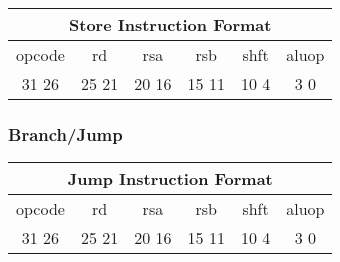 \documentclass[letterpaper, 11pt]{article}
\begin{document}
\begin{center}
		\begin{tabular}{|c|c|c|c|c|c|}
			\multicolumn{6}{c}{Store Instruction Format}\\ \hline
				\hspace{2pt} opcode \hspace{2pt} & \hspace{5pt} rd \hspace{5pt} &  \hspace{4pt} rsa \hspace{4pt} & \hspace{4pt}rsb  \hspace{4pt}& \hspace{10pt}shft  \hspace{10pt} & \hspace{3pt} aluop \hspace{3pt}   \\	\hline
			31 \hfill 26& 25 \hfill 21 &20 \hfill  16& 15 \hfill  11&10 \hfill   4&3 \hfill   0\\ \hline
		
	\end{tabular}
\end{center}
\subsubsection{Branch/Jump}

\begin{center}
		\begin{tabular}{|c|c|c|c|c|c|}
			\multicolumn{6}{c}{Jump Instruction Format}\\ \hline
				\hspace{2pt} opcode \hspace{2pt} & \hspace{5pt} rd \hspace{5pt} &  \hspace{4pt} rsa \hspace{4pt} & \hspace{4pt}rsb  \hspace{4pt}& \hspace{10pt}shft  \hspace{10pt} & \hspace{3pt} aluop \hspace{3pt}   \\	\hline
			31 \hfill 26& 25 \hfill 21 &20 \hfill  16& 15 \hfill  11&10 \hfill   4&3 \hfill   0\\ \hline
		
	\end{tabular}
\end{center}	
\end{document}
